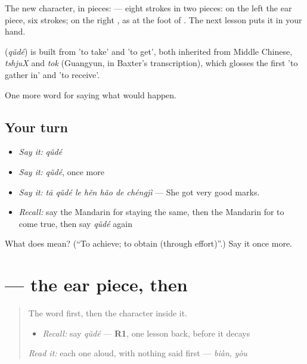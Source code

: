 The new character, in pieces:  — eight strokes in two pieces: on the left the ear piece, six strokes; on the right , as at the foot of . The next lesson puts it in your hand.

\begin{cousinweb}
\textbf{} (\emph{qǔdé}) is built from  'to take' and  'to get', both inherited from Middle Chinese, \emph{tshjuX} and \emph{tok} (Guangyun, in Baxter's transcription), which glosses the first 'to gather in' and 'to receive'.
\end{cousinweb}

\begin{grammarlens}[title={What you've built}]
One more word for saying what would happen.
\end{grammarlens}

\subsection*{Your turn}
\begin{itemize}
\raggedright
  \item \emph{Say it:} \emph{qǔdé}
  \item \emph{Say it:} \emph{qǔdé}, once more
  \item \emph{Say it:} \emph{tā qǔdé le hěn hǎo de chéngjì} — She got very good marks.
  \item \emph{Recall:} say the Mandarin for staying the same, then the Mandarin for to come true, then say \emph{qǔdé} again
\end{itemize}

\begin{tcolorbox}[breakable,colback=teal!4,colframe=teal!35!black,title={Before you move on}]
What does  mean? (\textquotedblleft{}To achieve; to obtain (through effort)\textquotedblright{}.) Say it once more.
\end{tcolorbox}
\section[\texorpdfstring{\zh{取} (qǔ)}{取 (qǔ)}]{ — the ear piece, then }

\label{lesson:ZH-W395-qu-take}



\begin{quote}
The word first, then the character inside it.

\begin{itemize}
\raggedright
  \item \emph{Recall:} say \emph{qǔdé} — \textbf{R1}, one lesson back, before it decays
\end{itemize}

\begin{quote}
 
\end{quote}

\emph{Read it:} each one aloud, with nothing said first — \emph{biàn}, \emph{yòu}
\end{quote}

